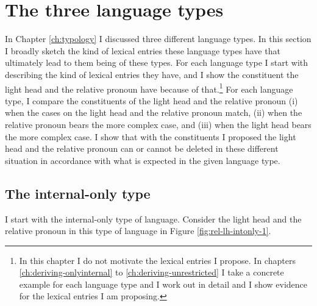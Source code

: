 \section{The three language types}\label{sec:three-types}

In Chapter \ref{ch:typology} I discussed three different language types. In this section I broadly sketch the kind of lexical entries these language types have that ultimately lead to them being of these types.
For each language type I start with describing the kind of lexical entries they have, and I show the constituent the light head and the relative pronoun have because of that.\footnote{
In this chapter I do not motivate the lexical entries I propose. In chapters \ref{ch:deriving-onlyinternal} to \ref{ch:deriving-unrestricted} I take a concrete example for each language type and I work out in detail and I show evidence for the lexical entries I am proposing.}
For each language type, I compare the constituents of the light head and the relative pronoun (i) when the cases on the light head and the relative pronoun match, (ii) when the relative pronoun bears the more complex case, and (iii) when the light head bears the more complex case.
I show that with the constituents I proposed the light head and the relative pronoun can or cannot be deleted in these different situation in accordance with what is expected in the given language type.

\subsection{The internal-only type}\label{sec:basic-internal}

I start with the internal-only type of language. Consider the light head and the relative pronoun in this type of language in Figure \ref{fig:rel-lh-intonly-1}.

